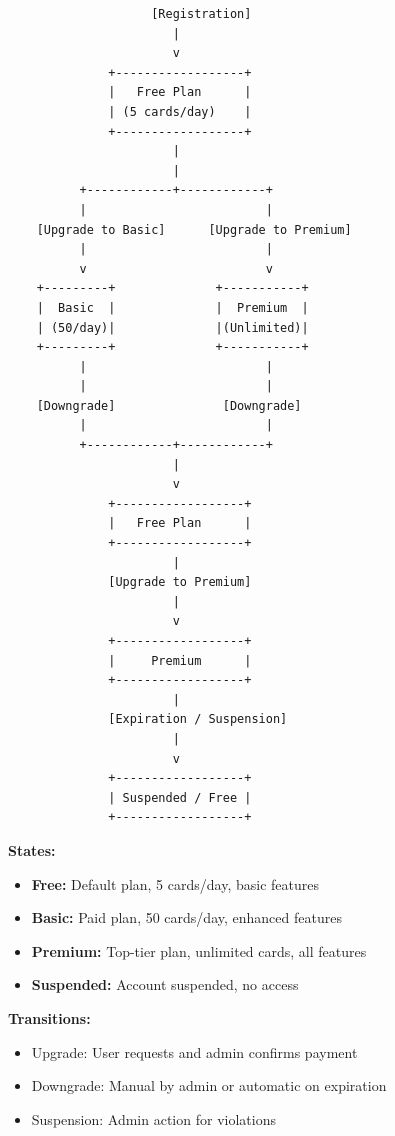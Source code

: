 \documentclass[12pt,a4paper]{article}
\begin{document}
\begin{verbatim}
                    [Registration]
                       |
                       v
              +------------------+
              |   Free Plan      |
              | (5 cards/day)    |
              +------------------+
                       |
                       |
          +------------+------------+
          |                         |
    [Upgrade to Basic]      [Upgrade to Premium]
          |                         |
          v                         v
    +---------+              +-----------+
    |  Basic  |              |  Premium  |
    | (50/day)|              |(Unlimited)|
    +---------+              +-----------+
          |                         |
          |                         |
    [Downgrade]               [Downgrade]
          |                         |
          +------------+------------+
                       |
                       v
              +------------------+
              |   Free Plan      |
              +------------------+
                       |
              [Upgrade to Premium]
                       |
                       v
              +------------------+
              |     Premium      |
              +------------------+
                       |
              [Expiration / Suspension]
                       |
                       v
              +------------------+
              | Suspended / Free |
              +------------------+
\end{verbatim}

\textbf{States:}
\begin{itemize}
    \item \textbf{Free:} Default plan, 5 cards/day, basic features
    \item \textbf{Basic:} Paid plan, 50 cards/day, enhanced features
    \item \textbf{Premium:} Top-tier plan, unlimited cards, all features
    \item \textbf{Suspended:} Account suspended, no access
\end{itemize}

\textbf{Transitions:}
\begin{itemize}
    \item Upgrade: User requests and admin confirms payment
    \item Downgrade: Manual by admin or automatic on expiration
    \item Suspension: Admin action for violations
\end{itemize}
\end{document}
